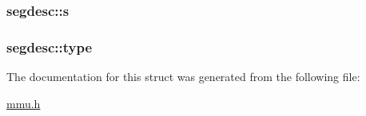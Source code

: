 \subsubsection[{\texorpdfstring{s}{s}}]{ segdesc\+::s}\hypertarget{structsegdesc_aacc67bb0857f0c77c1f8a5c9b8a1ac09}{}\label{structsegdesc_aacc67bb0857f0c77c1f8a5c9b8a1ac09}
\subsubsection[{\texorpdfstring{type}{type}}]{ segdesc\+::type}\hypertarget{structsegdesc_acb54ea5ee6d09cfcc8b4dd3e96e4ce5b}{}\label{structsegdesc_acb54ea5ee6d09cfcc8b4dd3e96e4ce5b}


The documentation for this struct was generated from the following file\+:\begin{DoxyCompactItemize}
\item 
\hyperlink{mmu_8h}{mmu.\+h}\end{DoxyCompactItemize}
